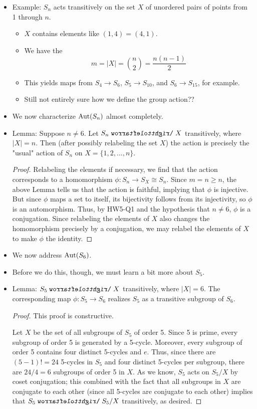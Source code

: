 \documentclass[../notes.tex]{subfiles}
\begin{document}
\begin{itemize}
    \item Example: $S_n$ acts transitively on the set $X$ of unordered pairs of points from 1 through $n$.
    \begin{itemize}
        \item $X$ contains elements like $(1,4)=(4,1)$.
        \item We have the
        \begin{equation*}
            m = |X|
            = \binom{n}{2}
            = \frac{n(n-1)}{2}
        \end{equation*}
        \item This yields maps from $S_4\to S_6$, $S_5\to S_{10}$, and $S_6\to S_{15}$, for example.
        \item Still not entirely sure how we define the group action??
    \end{itemize}
    \item We now characterize $\operatorname{Aut}(S_n)$ almost completely.
    \item Lemma: Suppose $n\neq 6$. Let $S_n\acts X$ transitively, where $|X|=n$. Then (after possibly relabeling the set $X$) the action is precisely the "usual" action of $S_n$ on $X=\{1,2,\dots,n\}$.
    \begin{proof}
        Relabeling the elements if necessary, we find that the action corresponds to a homomorphism $\phi:S_n\to S_X\cong S_n$. Since $m=n\geq n$, the above Lemma tells us that the action is faithful, implying that $\phi$ is injective. But since $\phi$ maps a set to itself, its bijectivity follows from its injectivity, so $\phi$ is an automorphism. Thus, by HW5-Q1 and the hypothesis that $n\neq 6$, $\phi$ is a conjugation. Since relabeling the elements of $X$ also changes the homomorphism precisely by a conjugation, we may relabel the elements of $X$ to make $\phi$ the identity.
    \end{proof}
    \item We now address $\operatorname{Aut}(S_6)$.
    \item Before we do this, though, we must learn a bit more about $S_5$.
    \item Lemma: $S_5\acts X$ transitively, where $|X|=6$. The corresponding map $\phi:S_5\to S_6$ realizes $S_5$ as a transitive subgroup of $S_6$.
    \begin{proof}
        This proof is constructive.\par
        Let $X$ be the set of all subgroups of $S_5$ of order 5. Since 5 is prime, every subgroup of order 5 is generated by a 5-cycle. Moreover, every subgroup of order 5 contains four distinct 5-cycles and $e$. Thus, since there are $(5-1)!=24$ 5-cycles in $S_5$ and four distinct 5-cycles per subgroup, there are $24/4=6$ subgroups of order 5 in $X$. As we know, $S_5$ acts on $S_5/X$ by coset conjugation; this combined with the fact that all subgroups in $X$ are conjugate to each other (since all 5-cycles are conjugate to each other) implies that $S_5\acts S_5/X$ transitively, as desired.

\end{proof}
\end{itemize}
\end{document}
